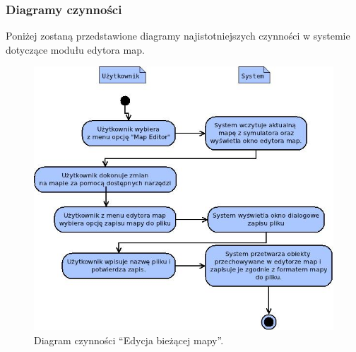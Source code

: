 \subsubsection{Diagramy czynności}
\begin{par}
		Poniżej zostaną przedstawione diagramy najistotniejszych czynności w systemie dotyczące modułu edytora map.
		\begin{figure}[!h]
		\centering
		\includegraphics[width=\textwidth]{obrazki/czynnosci_edytor_map.jpeg}
		\caption{Diagram czynności ``Edycja bieżącej mapy''.}
		\label{fig:czynn_edytor_map}
		\end{figure}
		\FloatBarrier
\end{par}



